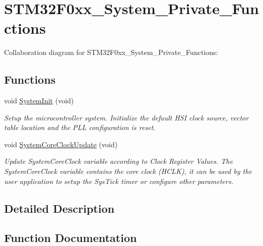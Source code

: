 \hypertarget{group___s_t_m32_f0xx___system___private___functions}{}\section{S\+T\+M32\+F0xx\+\_\+\+System\+\_\+\+Private\+\_\+\+Functions}
\label{group___s_t_m32_f0xx___system___private___functions}
Collaboration diagram for S\+T\+M32\+F0xx\+\_\+\+System\+\_\+\+Private\+\_\+\+Functions\+:
\subsection*{Functions}
\begin{DoxyCompactItemize}
\item 
void \hyperlink{group___s_t_m32_f0xx___system___private___functions_ga93f514700ccf00d08dbdcff7f1224eb2}{System\+Init} (void)
\begin{DoxyCompactList}\small\item\em Setup the microcontroller system. Initialize the default H\+SI clock source, vector table location and the P\+LL configuration is reset. \end{DoxyCompactList}\item 
void \hyperlink{group___s_t_m32_f0xx___system___private___functions_gae0c36a9591fe6e9c45ecb21a794f0f0f}{System\+Core\+Clock\+Update} (void)
\begin{DoxyCompactList}\small\item\em Update System\+Core\+Clock variable according to Clock Register Values. The System\+Core\+Clock variable contains the core clock (H\+C\+LK), it can be used by the user application to setup the Sys\+Tick timer or configure other parameters. \end{DoxyCompactList}\end{DoxyCompactItemize}


\subsection{Detailed Description}


\subsection{Function Documentation}
\mbox{\label{group___s_t_m32_f0xx___system___private___functions_gae0c36a9591fe6e9c45ecb21a794f0f0f}} 
